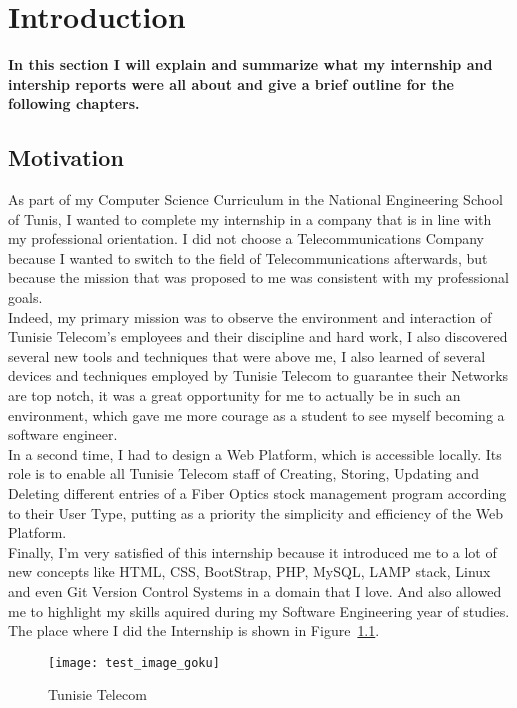 ﻿\chapter{Introduction}
\label{chap:intro}
\textbf{In this section I will explain and summarize what my internship and intership reports were all about and give a brief outline for the following chapters.}
\section{Motivation} %
	
	As part of my Computer Science Curriculum in the National Engineering School of Tunis, I wanted to complete my internship in a company that is in line with my professional orientation. I did not choose a Telecommunications Company because I wanted to switch to the field of Telecommunications afterwards, but because the mission that was proposed to me was consistent with my professional goals. \\  

	Indeed, my primary mission was to observe the environment and interaction of Tunisie Telecom's employees and their discipline and hard work, I also discovered several new tools and techniques that were above me, I also learned of several devices and techniques employed by Tunisie Telecom to guarantee their Networks are top notch, it was a great opportunity for me to actually be in such an environment, which gave me more courage as a student to see myself becoming a software engineer. \\
	
	In a second time, I had to design a Web Platform, which is accessible locally. Its role is to enable all Tunisie Telecom staff of Creating, Storing, Updating and Deleting different entries of a Fiber Optics stock management program according to their User Type, putting as a priority the simplicity and efficiency of the Web Platform.\\

	Finally,  I'm very satisfied of this internship because it introduced me to a lot of new concepts like HTML, CSS, BootStrap, PHP, MySQL, LAMP stack, Linux and even Git Version Control Systems in a domain that I love. And also allowed me to highlight my skills aquired during my Software Engineering year of studies. \\ 

The place where I did the Internship is shown in Figure~\ref{fig:test1}.
\begin{figure}[ht!] %
  \centering
  \texttt{[image: test\_image\_goku]}
  \caption[Where I Did the Internship]{Tunisie Telecom }%
  \label{fig:test1}
\end{figure}

